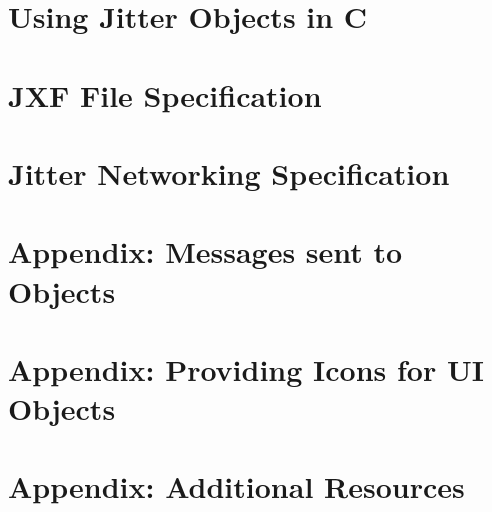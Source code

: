 \documentclass[a4paper]{book}
\begin{document}
\chapter{Using Jitter Objects in C}
\label{chapter_jit_usingobjs}
\hypertarget{chapter_jit_usingobjs}{}

\chapter{JXF File Specification}
\label{chapter_jit_jxf}
\hypertarget{chapter_jit_jxf}{}

\chapter{Jitter Networking Specification}
\label{chapter_jit_networking}
\hypertarget{chapter_jit_networking}{}

\chapter{Appendix: Messages sent to Objects}
\label{chapter_appendix_a}
\hypertarget{chapter_appendix_a}{}

\chapter{Appendix: Providing Icons for UI Objects}
\label{chapter_appendix_b}
\hypertarget{chapter_appendix_b}{}

\chapter{Appendix: Additional Resources}
\label{chapter_appendix_c}
\hypertarget{chapter_appendix_c}{}

\end{document}
